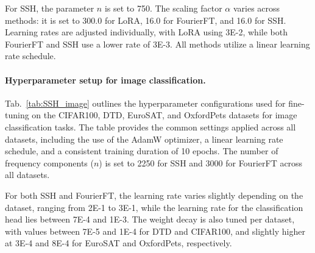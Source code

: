 For SSH, the parameter \( n \) is set to 750. The scaling factor \( \alpha \) varies across methods: it is set to 300.0 for LoRA, 16.0 for FourierFT, and 16.0 for SSH. Learning rates are adjusted individually, with LoRA using 3E-2, while both FourierFT and SSH use a lower rate of 3E-3. All methods utilize a linear learning rate schedule.


\paragraph{Hyperparameter setup for image classification.}


\begin{table}
\centering
{}
\caption{\small Hyperparameter setup for image classification.}
\label{tab:SSH_image}
\end{table}

Tab.~\ref{tab:SSH_image} outlines the hyperparameter configurations used for fine-tuning on the CIFAR100, DTD, EuroSAT, and OxfordPets datasets for image classification tasks. The table provides the common settings applied across all datasets, including the use of the AdamW optimizer, a linear learning rate schedule, and a consistent training duration of 10 epochs. The number of frequency components ($n$) is set to 2250 for SSH and 3000 for FourierFT across all datasets.

For both SSH and FourierFT, the learning rate varies slightly depending on the dataset, ranging from 2E-1 to 3E-1, while the learning rate for the classification head lies between 7E-4 and 1E-3. The weight decay is also tuned per dataset, with values between 7E-5 and 1E-4 for DTD and CIFAR100, and slightly higher at 3E-4 and 8E-4 for EuroSAT and OxfordPets, respectively.




